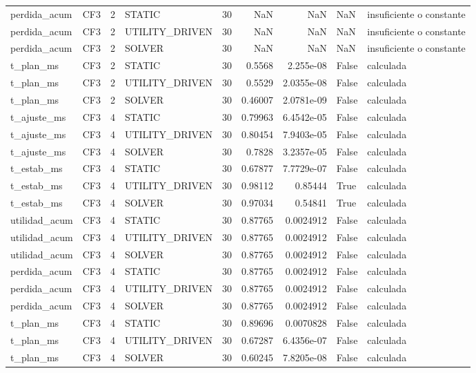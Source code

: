 \begin{tabular}{llrlrrrll}
perdida_acum & CF3 & 2 & STATIC & 30 & NaN & NaN & NaN & insuficiente o constante \\
perdida_acum & CF3 & 2 & UTILITY_DRIVEN & 30 & NaN & NaN & NaN & insuficiente o constante \\
perdida_acum & CF3 & 2 & SOLVER & 30 & NaN & NaN & NaN & insuficiente o constante \\
t_plan_ms & CF3 & 2 & STATIC & 30 & 0.5568 & 2.255e-08 & False & calculada \\
t_plan_ms & CF3 & 2 & UTILITY_DRIVEN & 30 & 0.5529 & 2.0355e-08 & False & calculada \\
t_plan_ms & CF3 & 2 & SOLVER & 30 & 0.46007 & 2.0781e-09 & False & calculada \\
t_ajuste_ms & CF3 & 4 & STATIC & 30 & 0.79963 & 6.4542e-05 & False & calculada \\
t_ajuste_ms & CF3 & 4 & UTILITY_DRIVEN & 30 & 0.80454 & 7.9403e-05 & False & calculada \\
t_ajuste_ms & CF3 & 4 & SOLVER & 30 & 0.7828 & 3.2357e-05 & False & calculada \\
t_estab_ms & CF3 & 4 & STATIC & 30 & 0.67877 & 7.7729e-07 & False & calculada \\
t_estab_ms & CF3 & 4 & UTILITY_DRIVEN & 30 & 0.98112 & 0.85444 & True & calculada \\
t_estab_ms & CF3 & 4 & SOLVER & 30 & 0.97034 & 0.54841 & True & calculada \\
utilidad_acum & CF3 & 4 & STATIC & 30 & 0.87765 & 0.0024912 & False & calculada \\
utilidad_acum & CF3 & 4 & UTILITY_DRIVEN & 30 & 0.87765 & 0.0024912 & False & calculada \\
utilidad_acum & CF3 & 4 & SOLVER & 30 & 0.87765 & 0.0024912 & False & calculada \\
perdida_acum & CF3 & 4 & STATIC & 30 & 0.87765 & 0.0024912 & False & calculada \\
perdida_acum & CF3 & 4 & UTILITY_DRIVEN & 30 & 0.87765 & 0.0024912 & False & calculada \\
perdida_acum & CF3 & 4 & SOLVER & 30 & 0.87765 & 0.0024912 & False & calculada \\
t_plan_ms & CF3 & 4 & STATIC & 30 & 0.89696 & 0.0070828 & False & calculada \\
t_plan_ms & CF3 & 4 & UTILITY_DRIVEN & 30 & 0.67287 & 6.4356e-07 & False & calculada \\
t_plan_ms & CF3 & 4 & SOLVER & 30 & 0.60245 & 7.8205e-08 & False & calculada \\

\end{tabular}
